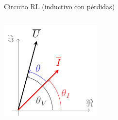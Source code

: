 \documentclass[aspectratio=169, usenames,svgnames,dvipsnames]{beamer}
\begin{document}
\begin{frame}{Circuito RL \hspace{3mm}(inductivo con pérdidas)}
\begin{columns}
    \begin{column}{0.5\columnwidth}
    \vspace{-22mm}
    
        \hspace{19mm} 
        \includegraphics[height=0.57\textheight]{../figs/fasorInductanciaReal_VI.pdf}
        
    \end{column}
    \end{columns}
\end{frame}

\end{document}
